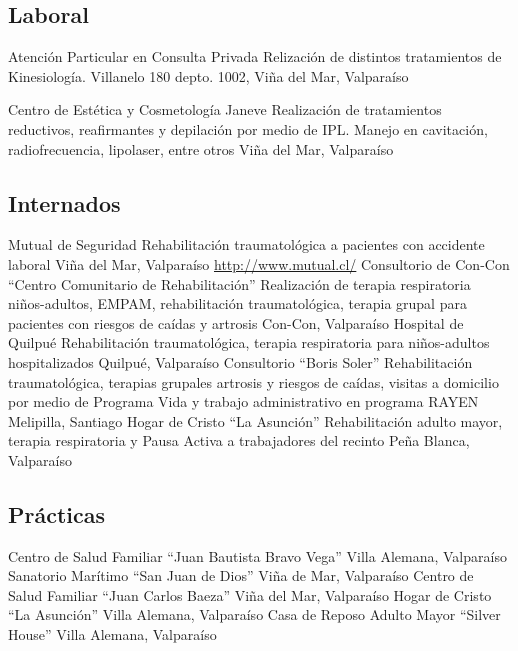 \documentclass[11pt,a4paper,sans]{moderncv}
\begin{document}
\subsection{Laboral}
        {Atención Particular en Consulta Privada}
        {Relización de distintos tratamientos de Kinesiología.}
        {}
        {}{Villanelo 180 depto. 1002, Viña del Mar, Valparaíso}

        {Centro de Estética y Cosmetología Janeve}
        {Realización de tratamientos reductivos, reafirmantes y depilación por medio de IPL. Manejo en cavitación, radiofrecuencia, lipolaser, entre otros}
        {}
        {}{Viña del Mar, Valparaíso}


\subsection{Internados}
        
        {Mutual de Seguridad}
        {Rehabilitación traumatológica a pacientes con accidente laboral}
        {}
        {Viña del Mar, Valparaíso}
        {\url{http://www.mutual.cl/}}
        {Consultorio de Con-Con ``Centro Comunitario de Rehabilitación''}
        {Realización de terapia respiratoria niños-adultos, EMPAM, rehabilitación traumatológica, terapia grupal para pacientes con riesgos de caídas y artrosis}
        {}
        {}
        {Con-Con, Valparaíso}
        {Hospital de Quilpué}
        {Rehabilitación traumatológica, terapia respiratoria para niños-adultos hospitalizados}
        {}
        {}
        {Quilpué, Valparaíso}
        {Consultorio ``Boris Soler''}
        {Rehabilitación traumatológica, terapias grupales artrosis y riesgos de caídas, visitas a domicilio por medio de Programa Vida y trabajo administrativo en programa RAYEN}
        {}
        {}
        {Melipilla, Santiago}
        {Hogar de Cristo ``La Asunción''}
        {Rehabilitación adulto mayor, terapia respiratoria y Pausa Activa a trabajadores del recinto}
        {}
        {}
        {Peña Blanca, Valparaíso}
        
\subsection{Prácticas}

\cventry{}
        {Centro de Salud Familiar ``Juan Bautista Bravo Vega''}
        {}
        {}
        {Villa Alemana, Valparaíso}
        {}
\cventry{}
        {Sanatorio Marítimo ``San Juan de Dios''}
        {}
        {}
        {Viña de Mar, Valparaíso}
        {}
\cventry{}
        {Centro de Salud Familiar ``Juan Carlos Baeza''}
        {}
        {}
        {Viña del Mar, Valparaíso}
        {}
\cventry{}
        {Hogar de Cristo ``La Asunción''}
        {}
        {}
        {Villa Alemana, Valparaíso}
        {}
\cventry{}
        {Casa de Reposo Adulto Mayor ``Silver House''}
        {}
        {}
        {Villa Alemana, Valparaíso}
        {}
        
\end{document}
